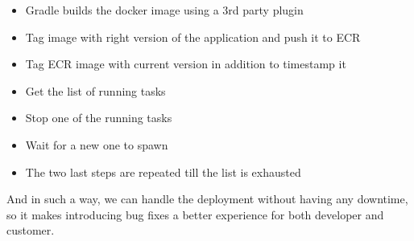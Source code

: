     \begin{itemize}
        \item Gradle builds the docker image using a 3rd party plugin
        \item Tag image with right version of the application and push it to ECR
        \item Tag ECR image with current version in addition to timestamp it
        \item Get the list of running tasks
        \item Stop one of the running tasks
        \item Wait for a new one to spawn
        \item The two last steps are repeated till the list is exhausted
    \end{itemize}

And in such a way, we can handle the deployment without having any downtime,
so it makes introducing bug fixes a better experience for both developer and 
customer.

